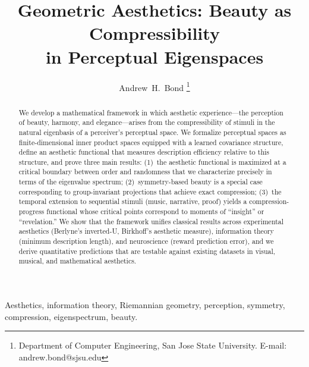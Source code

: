 \documentclass[journal]{IEEEtran}
\begin{document}
\title{Geometric Aesthetics: Beauty as Compressibility\\in Perceptual Eigenspaces}

\author{Andrew~H.~Bond
\thanks{Department of Computer Engineering, San Jose State University.
E-mail: andrew.bond@sjsu.edu}}


\maketitle

\begin{abstract}
We develop a mathematical framework in which aesthetic experience---the
perception of beauty, harmony, and elegance---arises from the
compressibility of stimuli in the natural eigenbasis of a perceiver's
perceptual space.  We formalize perceptual spaces as finite-dimensional
inner product spaces equipped with a learned covariance structure,
define an aesthetic functional that measures description efficiency
relative to this structure, and prove three main results:
(1)~the aesthetic functional is maximized at a critical boundary between
order and randomness that we characterize precisely in terms of the
eigenvalue spectrum;
(2)~symmetry-based beauty is a special case corresponding to
group-invariant projections that achieve exact compression;
(3)~the temporal extension to sequential stimuli (music, narrative,
proof) yields a compression-progress functional whose critical points
correspond to moments of ``insight'' or ``revelation.''
We show that the framework unifies classical results across
experimental aesthetics (Berlyne's inverted-U, Birkhoff's aesthetic
measure), information theory (minimum description length), and
neuroscience (reward prediction error), and we derive quantitative
predictions that are testable against existing datasets in visual,
musical, and mathematical aesthetics.
\end{abstract}

\begin{IEEEkeywords}
Aesthetics, information theory, Riemannian geometry, perception,
symmetry, compression, eigenspectrum, beauty.
\end{IEEEkeywords}

\end{document}

